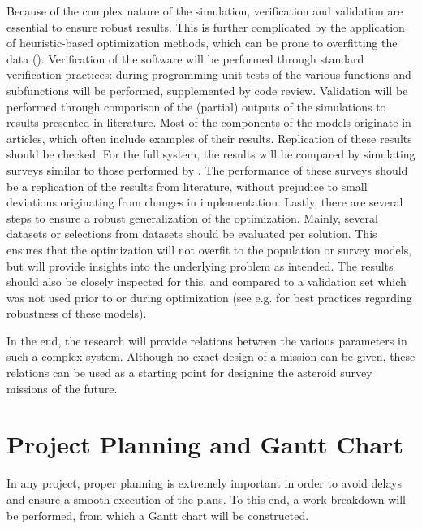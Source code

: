\documentclass[12pt, english, NoHyper]{AE4010-template}
\begin{document}
Because of the complex nature of the simulation, verification and validation are essential to ensure robust results. This is further complicated by the application of heuristic-based optimization methods, which can be prone to overfitting the data (\cite{DLOne}). Verification of the software will be performed through standard verification practices: during programming unit tests of the various functions and subfunctions will be performed, supplemented by code review. Validation will be performed through comparison of the (partial) outputs of the simulations to results presented in literature. Most of the components of the models originate in articles, which often include examples of their results. Replication of these results should be checked. For the full system, the results will be compared by simulating surveys similar to those performed by \cite{NEOSDT2}. The performance of these surveys should be a replication of the results from literature, without prejudice to small deviations originating from changes in implementation. Lastly, there are several steps to ensure a robust generalization of the optimization. Mainly, several datasets or selections from datasets should be evaluated per solution. This ensures that the optimization will not overfit to the population or survey models, but will provide insights into the underlying problem as intended. The results should also be closely inspected for this, and compared to a validation set which was not used prior to or during optimization (see e.g. \cite{DLTwo} for best practices regarding robustness of these models).

In the end, the research will provide relations between the various parameters in such a complex system. Although no exact design of a mission can be given, these relations can be used as a starting point for designing the asteroid survey missions of the future.


\section{Project Planning and Gantt Chart}
In any project, proper planning is extremely important in order to avoid delays and ensure a smooth execution of the plans. To this end, a work breakdown will be performed, from which a Gantt chart will be constructed.
\end{document}
